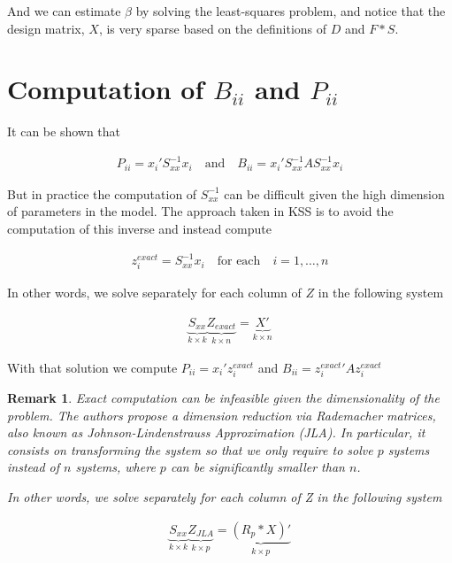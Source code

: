 \documentclass[12pt]{article}
\newtheorem{remark}{Remark}
\begin{document}
And we can estimate $\beta$ by solving the least-squares problem, and notice that the design matrix, $X$, is very sparse based on the definitions of $D$ and $F*S$.



\section{Computation of $B_{ii}$ and $P_{ii}$}

It can be shown that 

\begin{align*}
    P_{ii} = x_i' S_{xx}^{-1} x_i \quad \text{and} \quad B_{ii} = x_i' S_{xx}^{-1} A  S_{xx}^{-1} x_i
\end{align*}

\noindent But in practice the computation of $S_{xx}^{-1}$ can be difficult given the high dimension of parameters in the model. The approach taken in KSS is to avoid the computation of this inverse and instead compute 

\begin{align*}
    z_i^{exact} = S_{xx}^{-1} x_i \quad \text{for each} \quad i=1,\dots,n
\end{align*}

In other words, we solve separately for each column of $Z$ in the following system

\begin{align*}
    \underbrace{S_{xx}}_{k\times k} \underbrace{Z_{exact}}_{k\times n}  = \underbrace{X'}_{k\times n}
\end{align*}

\noindent With that solution we compute $P_{ii} = x_i' z_i^{exact}$ and $B_{ii} = {z_i^{exact}}' A z_i^{exact}$


\begin{remark}
Exact computation can be infeasible given the dimensionality of the problem. The authors propose a dimension reduction via Rademacher matrices, also known as Johnson-Lindenstrauss Approximation (JLA). In particular, it consists on transforming the system so that we only require to solve $p$ systems instead of $n$ systems, where $p$ can be significantly smaller than $n$.

In other words, we solve separately for each column of Z in the following system

\begin{align*}
    \underbrace{S_{xx}}_{k\times k} \underbrace{Z_{JLA}}_{k\times p}  = \underbrace{(R_p *X)'}_{k\times p}
\end{align*}


\end{remark}
\end{document}
